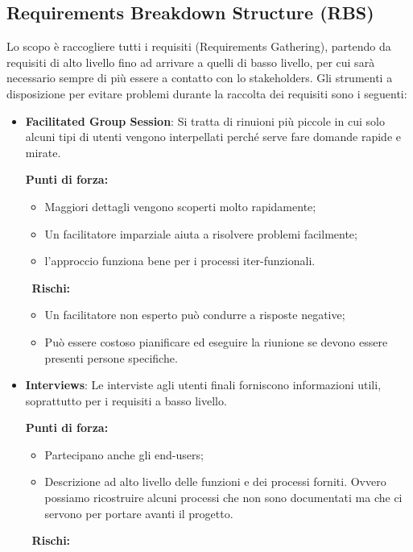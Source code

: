 \subsection{Requirements Breakdown Structure (RBS)}
Lo scopo è raccogliere tutti i requisiti (Requirements Gathering), partendo da requisiti di alto livello fino ad arrivare a quelli di basso livello, per cui sarà necessario sempre di più essere a contatto con lo stakeholders. Gli strumenti a disposizione per evitare problemi durante la raccolta dei requisiti sono i seguenti:
\begin{itemize}
	\item \textbf{Facilitated Group Session}:  Si tratta di rinuioni più piccole in cui solo alcuni tipi di utenti vengono interpellati perché serve fare domande rapide e mirate.\newline
	\begin{info}[]
		\textbf{Punti di forza:}
		\begin{itemize}
			\item Maggiori dettagli vengono scoperti molto rapidamente;
			\item Un facilitatore imparziale aiuta a risolvere problemi facilmente;
			\item l'approccio funziona bene per i processi iter-funzionali.
		\end{itemize}
		$\;\;$\textbf{Rischi:}
		\begin{itemize}
			\item Un facilitatore non esperto può condurre a risposte negative;
			\item Può essere costoso pianificare ed eseguire la riunione se devono essere presenti persone specifiche.
		\end{itemize}
	\end{info}
	\item \textbf{Interviews}: Le interviste agli utenti finali forniscono informazioni utili, soprattutto per i requisiti a basso livello.
	\begin{info}[]
		\textbf{Punti di forza:}
		\begin{itemize}
			\item Partecipano anche gli end-users;
			\item Descrizione ad alto livello delle funzioni e dei processi forniti. Ovvero possiamo ricostruire alcuni processi che non sono documentati ma che ci servono per portare avanti il progetto.
		\end{itemize}
		$\;\;$\textbf{Rischi:}
		\begin{itemize}

\end{itemize}
\end{info}
\end{itemize}

